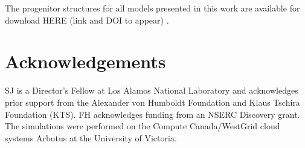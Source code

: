 \documentclass[useAMS,usenatbib]{mn2e}
\newcommand{\red}[1]{{\color{red} #1} }
\begin{document}
The progenitor structures for all models presented in this work are available
for download \red{HERE (link and DOI to appear)}.


\section*{Acknowledgements}
SJ is a Director's Fellow at Los Alamos National Laboratory and acknowledges
prior support from the Alexander von Humboldt Foundation and Klaus Tschira
Foundation (KTS). FH acknowledges funding from an NSERC Discovery grant. The simulations were performed on the Compute Canada/WestGrid cloud systems Arbutus at the University of Victoria. 
 
  

\label{lastpage}
\end{document}
